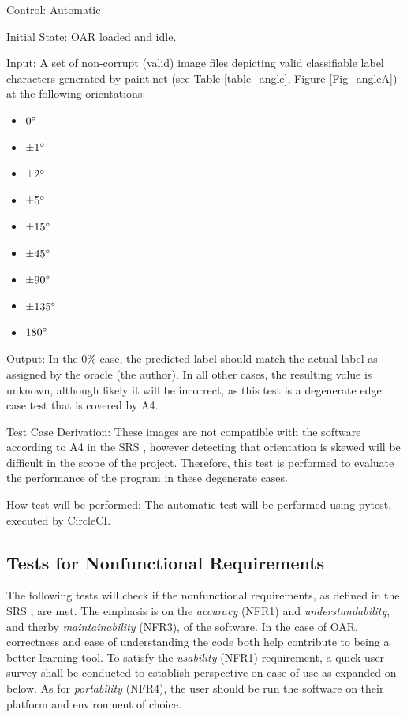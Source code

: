 \documentclass[12pt, titlepage]{article}
\begin{document}
\begin{enumerate}
    Control: Automatic
              
    Initial State: OAR loaded and idle.
              
    Input: A set of non-corrupt (valid) image files depicting valid classifiable label characters generated by paint.net (see Table \ref{table_angle}, Figure \ref{Fig_angleA}) at the following orientations:
    \begin{itemize}
      \item{$0\degree$}
      \item{$\pm 1\degree$}
      \item{$\pm 2\degree$}
      \item{$\pm 5\degree$}
      \item{$\pm 15\degree$}
      \item{$\pm 45\degree$}
      \item{$\pm 90\degree$}
      \item{$\pm 135\degree$}
      \item{$180\degree$}
    \end{itemize}
              
    Output: In the 0\% case, the predicted label should match the actual label as assigned by the oracle (the author). In all other cases,
    the resulting value is unknown, although likely it will be incorrect, as this test is a degenerate edge case test that is covered by A4.
              
    Test Case Derivation: These images are not compatible with the software according to A4 in the SRS \citep{SRS}, however detecting that orientation is
    skewed will be difficult in the scope of the project. Therefore, this test is performed to evaluate the performance of the program in 
    these degenerate cases.
              
    How test will be performed: The automatic test will be performed using pytest, executed by CircleCI.
\end{enumerate}






\subsection{Tests for Nonfunctional Requirements}

The following tests will check if the nonfunctional requirements, as defined in the SRS \citep{SRS}, are 
met. The emphasis is on the \textit{accuracy} (NFR1) and \textit{understandability}, and 
therby \textit{maintainability} (NFR3), of the software. In the case of OAR, 
correctness and ease of understanding the code both help contribute to being a better learning tool.
To satisfy the \textit{usability} (NFR1) requirement, a quick user survey shall be
conducted to establish perspective on ease of use as expanded on below. As for \textit{portability} (NFR4),
the user should be run the software on their platform and environment of choice.
\end{document}
